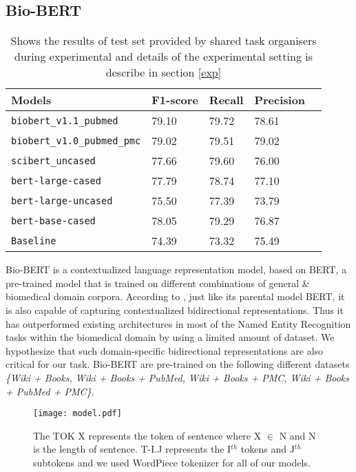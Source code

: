 \documentclass[11pt,a4paper]{article}
\begin{document}
\subsection{Bio-BERT} \label{bio}




\begin{table*}
\centering
\begin{tabular}{lllll}
\hline
\textbf{Models} & \textbf{F1-score} & \textbf{Recall} & \textbf{Precision}\\
\hline
\verb|biobert_v1.1_pubmed| & 79.10 &  79.72 & 78.61 \\ 
\verb|biobert_v1.0_pubmed_pmc|  & 79.02 &  79.51 & 79.02 \\
\verb|scibert_uncased|  & 77.66 &  79.60 & 76.00 \\
\verb|bert-large-cased|  & 77.79  &  78.74 & 77.10 \\ 
\verb|bert-large-uncased|  & 75.50 &  77.39 & 73.79 \\ 
\verb|bert-base-cased|  &  78.05 &  79.29 & 76.87  \\
\verb|Baseline |  & 74.39  &  73.32 & 75.49 \\\hline
\end{tabular}

\caption{\label{result} 
{Shows the results of test set provided by shared task organisers during experimental and details of the experimental setting is describe in section \ref{exp}}
}

\end{table*}
Bio-BERT \cite{10.1093/bioinformatics/btz682} is a contextualized language representation model, based on BERT, a pre-trained model that is trained on different combinations of general \& biomedical domain corpora.
According to \citet{10.1093/bioinformatics/btz682}, just like its parental model BERT, it is also capable of capturing contextualized bidirectional representations. Thus it has outperformed existing architectures in most of the Named Entity Recognition tasks within the biomedical domain by using a limited amount of dataset. We hypothesize that such domain-specific bidirectional representations are also critical for our task. Bio-BERT are pre-trained on the following different datasets \textit{\{Wiki + Books, Wiki + Books + PubMed, Wiki + Books + PMC, Wiki + Books + PubMed + PMC\}}.



\begin{figure}
\centering
\texttt{[image: model.pdf]}
    \caption{The TOK X represents the token of sentence where X \(\in\) N and N is the length of sentence. T-I.J represents the I\(^{th}\) tokens and J\(^{th}\) subtokens and we used WordPiece tokenizer for all of our models.}
    \label{fig:model}
\end{figure}
\end{document}
